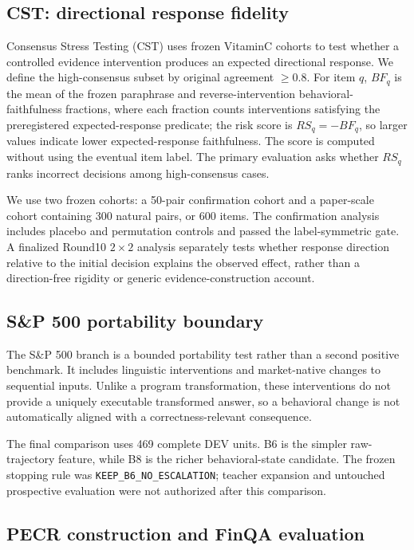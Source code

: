 \documentclass[11pt]{article}
\begin{document}
\subsection{CST: directional response fidelity}

Consensus Stress Testing (CST) uses frozen VitaminC cohorts \citep{schuster-etal-2021-get} to test whether a controlled evidence intervention produces an expected directional response. We define the high-consensus subset by original agreement \(\ge 0.8\). For item \(q\), \(BF_q\) is the mean of the frozen paraphrase and reverse-intervention behavioral-faithfulness fractions, where each fraction counts interventions satisfying the preregistered expected-response predicate; the risk score is \(RS_q=-BF_q\), so larger values indicate lower expected-response faithfulness. The score is computed without using the eventual item label. The primary evaluation asks whether \(RS_q\) ranks incorrect decisions among high-consensus cases.

We use two frozen cohorts: a 50-pair confirmation cohort and a paper-scale cohort containing 300 natural pairs, or 600 items. The confirmation analysis includes placebo and permutation controls and passed the label-symmetric gate. A finalized Round10 \(2\times2\) analysis separately tests whether response direction relative to the initial decision explains the observed effect, rather than a direction-free rigidity or generic evidence-construction account.

\subsection{S\&P 500 portability boundary}

The S\&P 500 branch is a bounded portability test rather than a second positive benchmark. It includes linguistic interventions and market-native changes to sequential inputs. Unlike a program transformation, these interventions do not provide a uniquely executable transformed answer, so a behavioral change is not automatically aligned with a correctness-relevant consequence.

The final comparison uses 469 complete DEV units. B6 is the simpler raw-trajectory feature, while B8 is the richer behavioral-state candidate. The frozen stopping rule was \texttt{KEEP\_B6\_NO\_ESCALATION}; teacher expansion and untouched prospective evaluation were not authorized after this comparison.

\subsection{PECR construction and FinQA evaluation}
\end{document}
